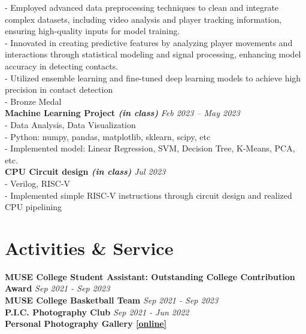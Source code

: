 \documentclass[a4paper,10pt]{article}
\begin{document}
- Employed advanced data preprocessing techniques to clean and integrate complex datasets, including video analysis and player tracking information, ensuring high-quality inputs for model training.\\
- Innovated in creating predictive features by analyzing player movements and interactions through statistical modeling and signal processing, enhancing model accuracy in detecting contacts.\\
- Utilized ensemble learning and fine-tuned deep learning models to achieve high precision in contact detection\\
- Bronze Medal\\
\textbf{Machine Learning Project \textit{(in class)}} \hfill \textit{Feb 2023 -- May 2023}\\
- Data Analysis, Data Visualization\\
- Python: numpy, pandas, matplotlib, sklearn, scipy, etc\\
- Implemented model: Linear Regression, SVM, Decision Tree, K-Means, PCA, etc.\\
\textbf{CPU Circuit design \textit{(in class)}} \hfill \textit{Jul 2023}\\
- Verilog, RISC-V\\
- Implemented simple RISC-V instructions through circuit design and realized CPU pipelining

\section*{Activities \& Service}
\textbf{MUSE College Student Assistant: Outstanding College Contribution Award} \hfill \textit{Sep 2021 - Sep 2023}\\
\textbf{MUSE College Basketball Team} \hfill \textit{Sep 2021 - Sep 2023}\\
\textbf{P.I.C. Photography Club} \hfill \textit{Sep 2021 - Jun 2022}\\
\textbf{Personal Photography Gallery \href{https://unsplash.com/@tobyyang}{[online]}} \\
\end{document}
